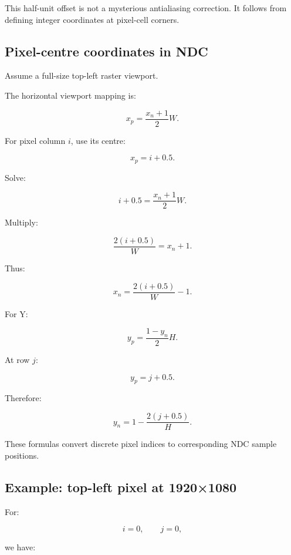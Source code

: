 This half-unit offset is not a mysterious antialiasing correction. It follows from defining integer coordinates at pixel-cell corners.

\subsection{Pixel-centre coordinates in NDC}\label{02-foundations-ii-ch033-pixel-centre-coordinates-in-ndc}

\hypertarget{02-foundations-ii-ch033-pixel-centre-coordinates-in-ndc}{}

Assume a full-size top-left raster viewport.

The horizontal viewport mapping is:

\[
 x_p=\frac{x_n+1}{2}W.
\]

For pixel column \(i\), use its centre:

\[
 x_p=i+0.5.
\]

Solve:

\[
 i+0.5=\frac{x_n+1}{2}W.
\]

Multiply:

\[
 \frac{2(i+0.5)}W=x_n+1.
\]

Thus:

\[
 \boxed{ x_n=\frac{2(i+0.5)}W-1 }.
\]

For Y:

\[
 y_p=\frac{1-y_n}{2}H.
\]

At row \(j\):

\[
 y_p=j+0.5.
\]

Therefore:

\[
 \boxed{ y_n=1-\frac{2(j+0.5)}H }.
\]

These formulas convert discrete pixel indices to corresponding NDC sample positions.

\begin{allmightroleexample}

\subsection{Example: top-left pixel at 1920×1080}\label{02-foundations-ii-ch033-example-top-left-pixel-at-19201080}

\hypertarget{02-foundations-ii-ch033-example-top-left-pixel-at-19201080}{}

For:

\end{allmightroleexample}

\[
 i=0,\qquad j=0,
\]

we have:

